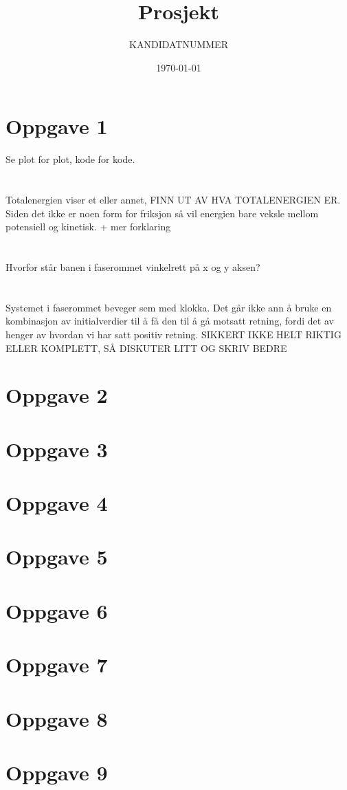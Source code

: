 \documentclass[norsk,a4paper,12pt]{article}
\title{Prosjekt}
\author{KANDIDATNUMMER}
\date{\today}
\begin{document}
\maketitle


\section*{Oppgave 1}

Se plot for plot, kode for kode.
\\
\\
\\
Totalenergien viser et eller annet, FINN UT AV HVA TOTALENERGIEN ER. Siden det ikke er noen form for friksjon så vil energien bare veksle mellom potensiell og kinetisk. + mer forklaring
\\
\\
\\
Hvorfor står banen i faserommet vinkelrett på x og y aksen?
\\
\\
\\
Systemet i faserommet beveger sem med klokka. Det går ikke ann å bruke en kombinasjon av initialverdier til å få den til å gå motsatt retning, fordi det av henger av hvordan vi har satt positiv retning.  SIKKERT IKKE HELT RIKTIG ELLER KOMPLETT, SÅ DISKUTER LITT OG SKRIV BEDRE




\section*{Oppgave 2}

\section*{Oppgave 3}

\section*{Oppgave 4}

\section*{Oppgave 5}

\section*{Oppgave 6}

\section*{Oppgave 7}

\section*{Oppgave 8}

\section*{Oppgave 9}
\end{document}
